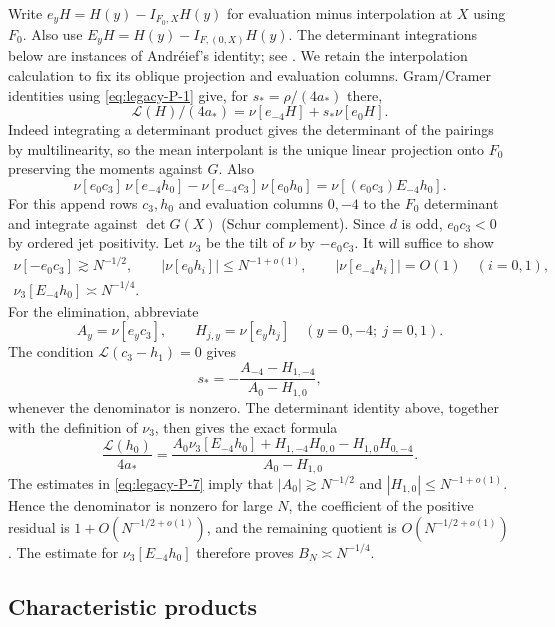 Write $e_y H=H(y)-I_{F_0,X}H(y)$ for evaluation minus interpolation at $X$ using $F_0$. Also use $E_y H=H(y)-I_{F,(0,X)}H(y)$. The determinant integrations below are instances of Andr\'eief's identity; see \cite[Equation~(1.3)]{TracyWidom1998}. We retain the interpolation calculation to fix its oblique projection and evaluation columns. Gram/Cramer identities using \eqref{eq:legacy-P-1} give, for $s_*=\rho/(4a_*)$ there,
\[
 \mathcal L(H)/(4a_*)=\nu[e_{-4}H]+s_*\nu[e_0 H].
\]
Indeed integrating a determinant product gives the determinant of the pairings by multilinearity, so the mean interpolant is the unique linear projection onto $F_0$ preserving the moments against $G$. Also
\[
 \nu[e_0 c_3]\,\nu[e_{-4}h_0]-\nu[e_{-4}c_3]\,\nu[e_0 h_0]
 =\nu[(e_0 c_3) E_{-4}h_0].
\]
For this append rows $c_3,h_0$ and evaluation columns $0,-4$ to the $F_0$ determinant and integrate against $\det G(X)$ (Schur complement). Since $d$ is odd, $e_0 c_3<0$ by ordered jet positivity. Let $\nu_3$ be the tilt of $\nu$ by $-e_0 c_3$. It will suffice to show
\begin{equation}
 \begin{gathered}
 \nu[-e_0 c_3]\gtrsim N^{-1/2},\qquad |\nu[e_0 h_i]|\le N^{-1+o(1)},\qquad
 |\nu[e_{-4}h_i]|=O(1)\quad (i=0,1),\\
 \nu_3[E_{-4} h_0]\asymp N^{-1/4}.
 \end{gathered}                                                     \label{eq:legacy-P-7}
\end{equation}
For the elimination, abbreviate
\[
 A_y=\nu[e_yc_3],\qquad H_{j,y}=\nu[e_yh_j]
 \quad(y=0,-4;\ j=0,1).
\]
The condition $\mathcal L(c_3-h_1)=0$ gives
\[
 s_*=-\frac{A_{-4}-H_{1,-4}}{A_0-H_{1,0}},
\]
whenever the denominator is nonzero. The determinant identity above, together with the definition of $\nu_3$, then gives the exact formula
\[
 \frac{\mathcal L(h_0)}{4a_*}
 =\frac{A_0\nu_3[E_{-4}h_0]
        +H_{1,-4}H_{0,0}-H_{1,0}H_{0,-4}}
       {A_0-H_{1,0}}.
\]
The estimates in \eqref{eq:legacy-P-7} imply that $|A_0|\gtrsim N^{-1/2}$ and $|H_{1,0}|\le N^{-1+o(1)}$. Hence the denominator is nonzero for large $N$, the coefficient of the positive residual is $1+O(N^{-1/2+o(1)})$, and the remaining quotient is $O(N^{-1/2+o(1)})$. The estimate for $\nu_3[E_{-4}h_0]$ therefore proves $B_N\asymp N^{-1/4}$.

\subsection{Characteristic products}

